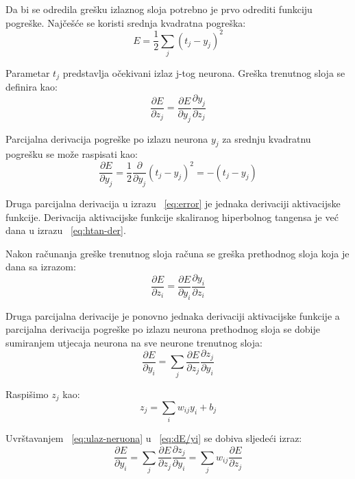 \documentclass[times, utf8, zavrsni, numeric]{fer}
\begin{document}
Da bi se odredila grešku izlaznog sloja potrebno je prvo odrediti funkciju pogreške. Najčešće se koristi srednja kvadratna pogreška:
\begin{equation}\label{eq:sr-kv-pogr}
  E = \frac{1}{2}\sum_j(t_j-y_j)^2
\end{equation}

Parametar $t_j$ predstavlja očekivani izlaz j-tog neurona. Greška trenutnog sloja se definira kao:
\begin{equation}\label{eq:error}
\dfrac{\partial E}{\partial z_j} = \dfrac{\partial E}{\partial y_j} \dfrac{\partial y_j}{\partial z_j}
\end{equation}

Parcijalna derivacija pogreške po izlazu neurona $y_j$ za srednju kvadratnu pogrešku se može raspisati kao:
\begin{equation}\label{eq:sr-kv-pogr-der}
\dfrac{\partial E}{\partial y_j} = \frac{1}{2}\dfrac{\partial}{\partial y_j}(t_j-y_j)^2 = -(t_j - y_j)
\end{equation}

Druga parcijalna derivacija u izrazu ~\ref{eq:error} je jednaka derivaciji aktivacijske funkcije. Derivacija aktivacijske funkcije skaliranog hiperbolnog tangensa je već dana u izrazu ~\ref{eq:htan-der}.

Nakon računanja greške trenutnog sloja računa se greška prethodnog sloja koja je dana sa izrazom:
\begin{equation}\label{eq:error-prethodni}
\dfrac{\partial E}{\partial z_i} = \dfrac{\partial E}{\partial y_i} \dfrac{\partial y_i}{\partial z_i} 
\end{equation}

Druga parcijalna derivacije je ponovno jednaka derivaciji aktivacijske funkcije a parcijalna derivacija pogreške po izlazu neurona prethodnog sloja se dobije sumiranjem utjecaja neurona na sve neurone trenutnog sloja:
\begin{equation}\label{eq:dE/yi}
\dfrac{\partial E}{\partial y_i} = \sum_j\dfrac{\partial E}{\partial z_j}\dfrac{\partial z_j}{\partial y_i} 
\end{equation}

Raspišimo $z_j$ kao:
\begin{equation}\label{eq:ulaz-neruona}
z_j = \sum_i w_{ij}y_i + b_j
\end{equation}

Uvrštavanjem ~\ref{eq:ulaz-neruona} u ~\ref{eq:dE/yi} se dobiva sljedeći izraz:
\begin{equation}\label{eq:dE/yi2}
\dfrac{\partial E}{\partial y_i} = \sum_j\dfrac{\partial E}{\partial z_j}\dfrac{\partial z_j}{\partial y_i} = \sum_j w_{ij}\dfrac{\partial E}{\partial z_j}
\end{equation}
\end{document}
